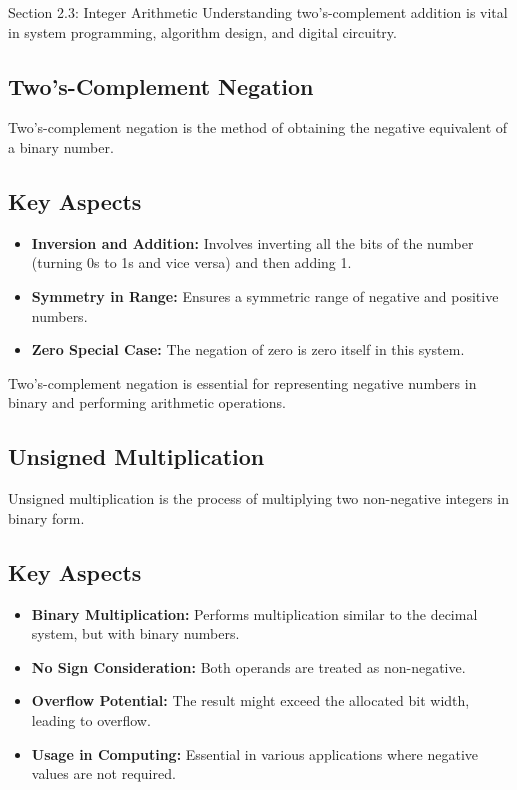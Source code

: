 \begin{notes}{Section 2.3: Integer Arithmetic}
    Understanding two's-complement addition is vital in system programming, algorithm design, and digital circuitry.

    \subsection*{Two's-Complement Negation}

    Two's-complement negation is the method of obtaining the negative equivalent of a binary number.

    \subsection*{Key Aspects}
    
    \begin{itemize}
        \item \textbf{Inversion and Addition:} Involves inverting all the bits of the number (turning 0s to 1s and vice versa) and then adding 1.
        \item \textbf{Symmetry in Range:} Ensures a symmetric range of negative and positive numbers.
        \item \textbf{Zero Special Case:} The negation of zero is zero itself in this system.
    \end{itemize}
    
    Two's-complement negation is essential for representing negative numbers in binary and performing arithmetic operations.

    \subsection*{Unsigned Multiplication}

    Unsigned multiplication is the process of multiplying two non-negative integers in binary form.

    \subsection*{Key Aspects}
    
    \begin{itemize}
        \item \textbf{Binary Multiplication:} Performs multiplication similar to the decimal system, but with binary numbers.
        \item \textbf{No Sign Consideration:} Both operands are treated as non-negative.
        \item \textbf{Overflow Potential:} The result might exceed the allocated bit width, leading to overflow.
        \item \textbf{Usage in Computing:} Essential in various applications where negative values are not required.
    \end{itemize}
    

\end{notes}
